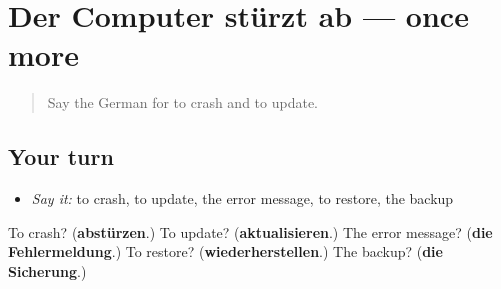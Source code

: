 \section[(dialogue)]{Der Computer stürzt ab — once more}

\label{lesson:GE-R397-review-final-397}



\begin{quote}
Say the German for to crash and to update.
\end{quote}

\subsection*{Your turn}
\begin{itemize}
\raggedright
  \item \emph{Say it:} to crash, to update, the error message, to restore, the backup
\end{itemize}

\begin{tcolorbox}[breakable,colback=teal!4,colframe=teal!35!black,title={Before you move on}]
To crash? (\textbf{abstürzen}.) To update? (\textbf{aktualisieren}.) The error message? (\textbf{die Fehlermeldung}.) To restore? (\textbf{wiederherstellen}.) The backup? (\textbf{die Sicherung}.)
\end{tcolorbox}
